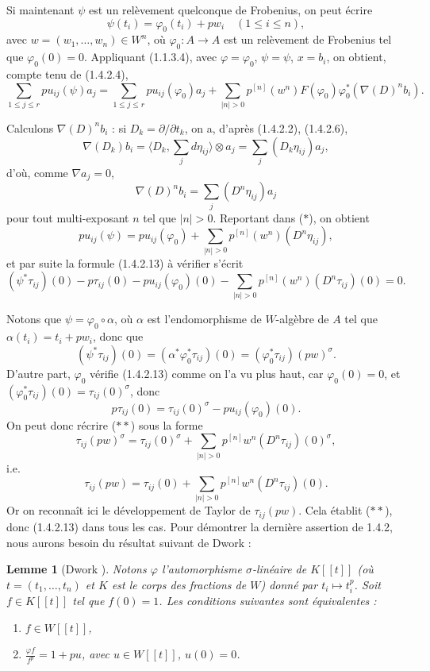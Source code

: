 \documentclass[12pt,a4paper]{article}
\theoremstyle{plain}
\newtheorem{lemma}[theorem]{Lemme}
\theoremstyle{definition}
\theoremstyle{remark}
\begin{document}
Si maintenant $\psi$ est un rel\`evement quelconque de Frobenius, on peut \'ecrire
\[
\psi(t_i) = \varphi_0(t_i) + pw_i \quad (1 \leqslant i \leqslant n),
\]
avec $w = (w_1, \ldots, w_n) \in W^n$, o\`u $\varphi_0 : A \to A$ est un rel\`evement de Frobenius tel que $\varphi_0(0) = 0$. Appliquant (1.1.3.4), avec $\varphi = \varphi_0$, $\psi = \psi$, $x = b_i$, on obtient, compte tenu de (1.4.2.4),
\begin{equation*}
\sum_{1\leqslant j\leqslant r} p u_{ij}(\psi)a_j = \sum_{1\leqslant j\leqslant r} p u_{ij}(\varphi_0)a_j + \sum_{|n|>0} p^{[n]}(w^n)F(\varphi_0)\varphi_0^*(\nabla(D)^n b_i). \tag{$\ast$}
\end{equation*}

Calculons $\nabla(D)^n b_i$ : si $D_k = \partial/\partial t_k$, on a, d'apr\`es (1.4.2.2), (1.4.2.6),
\[
\nabla(D_k)b_i = \langle D_k, \sum_j d\eta_{ij} \rangle \otimes a_j = \sum_j (D_k \eta_{ij})a_j,
\]
d'o\`u, comme $\nabla a_j = 0$,
\[
\nabla(D)^n b_i = \sum_j (D^n \eta_{ij})a_j
\]
pour tout multi-exposant $n$ tel que $|n| > 0$. Reportant dans ($\ast$), on obtient
\[
pu_{ij}(\psi) = pu_{ij}(\varphi_0) + \sum_{|n|>0} p^{[n]}(w^n)(D^n \eta_{ij}),
\]
et par suite la formule (1.4.2.13) \`a v\'erifier s'\'ecrit
\begin{equation*}
(\psi^*\tau_{ij})(0) - p\tau_{ij}(0) - pu_{ij}(\varphi_0)(0) - \sum_{|n|>0} p^{[n]}(w^n)(D^n \tau_{ij})(0) = 0. \tag{$\ast\ast$}
\end{equation*}

Notons que $\psi = \varphi_0 \circ \alpha$, o\`u $\alpha$ est l'endomorphisme de $W$-alg\`ebre de $A$ tel que $\alpha(t_i) = t_i + pw_i$, donc que
\[
(\psi^*\tau_{ij})(0) = (\alpha^*\varphi_0^*\tau_{ij})(0) = (\varphi_0^*\tau_{ij})(pw)^{\sigma}.
\]
D'autre part, $\varphi_0$ v\'erifie (1.4.2.13) comme on l'a vu plus haut, car $\varphi_0(0) = 0$, et $(\varphi_0^*\tau_{ij})(0) = \tau_{ij}(0)^\sigma$, donc
\[
p\tau_{ij}(0) = \tau_{ij}(0)^\sigma - pu_{ij}(\varphi_0)(0).
\]
On peut donc r\'ecrire ($\ast\ast$) sous la forme
\[
\tau_{ij}(pw)^\sigma = \tau_{ij}(0)^\sigma + \sum_{|n|>0} p^{[n]}w^n(D^n\tau_{ij})(0)^\sigma,
\]
i.e.
\[
\tau_{ij}(pw) = \tau_{ij}(0) + \sum_{|n|>0} p^{[n]}w^n(D^n\tau_{ij})(0).
\]
Or on reconna\^it ici le d\'eveloppement de Taylor de $\tau_{ij}(pw)$. Cela \'etablit ($\ast\ast$), donc (1.4.2.13) dans tous les cas. Pour d\'emontrer la derni\`ere assertion de 1.4.2, nous aurons besoin du r\'esultat suivant de Dwork :

\begin{lemma}[Dwork {\cite[lemma 1]{Dwork1958}}]\label{lem:1.4.3}
Notons $\varphi$ l'automorphisme $\sigma$-lin\'eaire de $K[[t]]$ (o\`u $t = (t_1, \ldots, t_n)$ et $K$ est le corps des fractions de $W$) donn\'e par $t_i \mapsto t_i^p$. Soit $f \in K[[t]]$ tel que $f(0) = 1$. Les conditions suivantes sont \'equivalentes :
\begin{enumerate}[label=(\roman*)]
\item $f \in W[[t]]$,
\item $\displaystyle\frac{\varphi f}{f^p} = 1 + pu$, avec $u \in W[[t]]$, $u(0) = 0$.
\end{enumerate}
\end{lemma}
\end{document}
